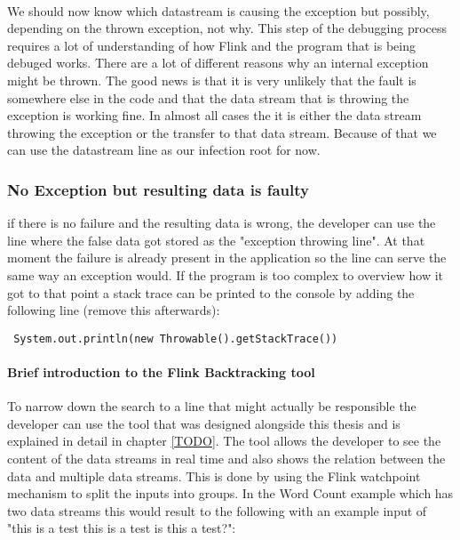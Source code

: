 \paragraph{} We should now know which datastream is causing the exception but possibly, depending on the thrown exception, not why. This step of the debugging process requires a lot of understanding of how Flink and the program that is being debuged works. There are a lot of different reasons why an internal exception might be thrown. The good news is that it is very unlikely that the fault is somewhere else in the code and that the data stream that is throwing the exception is working fine. In almost all cases the it is either the data stream throwing the exception or the transfer to that data stream. Because of that we can use the datastream line as our infection root for now.

\subsubsection{No Exception but resulting data is faulty}
if there is no failure and the resulting data is wrong, the developer can use the line where the false data got stored as the "exception throwing line". At that moment the failure is already present in the application so the line can serve the same way an exception would. If the program is too complex to overview how it got to that point a stack trace can be printed to the console by adding the following line (remove this afterwards):
\begin{lstlisting}
 System.out.println(new Throwable().getStackTrace())
\end{lstlisting}

\paragraph{Brief introduction to the Flink Backtracking tool}
\label{mdfBriefIntroTool}

To narrow down the search to a line that might actually be responsible the developer can use the tool that was designed alongside this thesis and is explained in detail in chapter \ref{TODO}. The tool allows the developer to see the content of the data streams in real time and also shows the relation between the data and multiple data streams. This is done by using  the Flink watchpoint mechanism to split the inputs into groups. In the Word Count example which has two data streams this would result to the following with an example input of "this is a test this is a test is this a test?":

